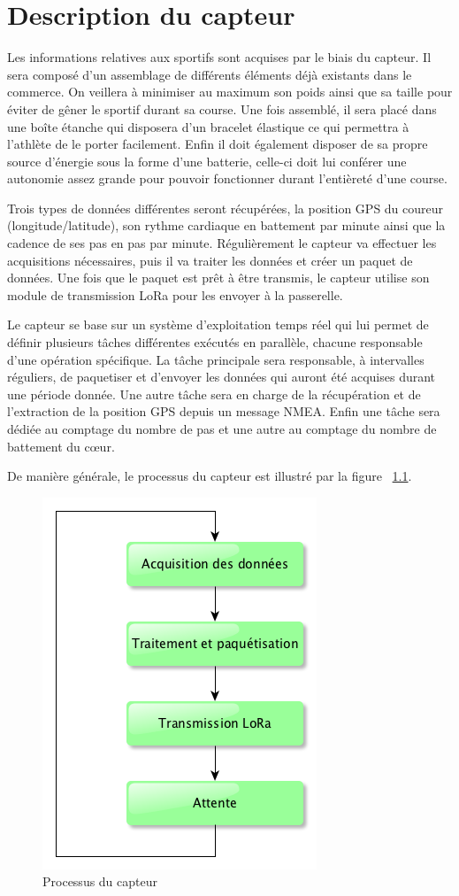 \chapter{Description du capteur} \label{desc_capteur}

Les informations relatives aux sportifs sont acquises par le biais du capteur. Il sera composé d’un assemblage de différents éléments déjà existants dans le commerce. On veillera à minimiser au maximum son poids ainsi que sa taille pour éviter de gêner le sportif durant sa course. Une fois assemblé, il sera placé dans une boîte étanche qui disposera d’un bracelet élastique ce qui permettra à l’athlète de le porter facilement. Enfin il doit également disposer de sa propre source d’énergie sous la forme d’une batterie, celle-ci doit lui conférer une autonomie assez grande pour pouvoir fonctionner durant l’entièreté d’une course.

Trois types de données différentes seront récupérées, la position GPS du coureur (longitude/latitude), son rythme cardiaque en battement par minute ainsi que la cadence de ses pas en pas par minute. Régulièrement le capteur va effectuer les acquisitions nécessaires, puis il va traiter les données et créer un paquet de données. Une fois que le paquet est prêt à être transmis, le capteur utilise son module de transmission LoRa pour les envoyer à la passerelle. 

Le capteur se base sur un système d'exploitation temps réel qui lui permet de définir plusieurs tâches différentes exécutés en parallèle, chacune responsable d'une opération spécifique. La tâche principale sera responsable, à intervalles réguliers, de paquetiser et d'envoyer les données qui auront été acquises durant une période donnée. Une autre tâche sera en charge de la récupération et de l'extraction de la position GPS depuis un message NMEA. Enfin une tâche sera dédiée au comptage du nombre de pas et une autre au comptage du nombre de battement du cœur.

De manière générale, le processus du capteur est illustré par la figure ~\ref{fig:proc_capteur}.

\begin{figure}[htb]
\centering 
\includegraphics[width=0.4\columnwidth]{../images/capteur_flowchart.png} 
\caption[Processus Capteur]{Processus du capteur}
\label{fig:proc_capteur}
\end{figure}

